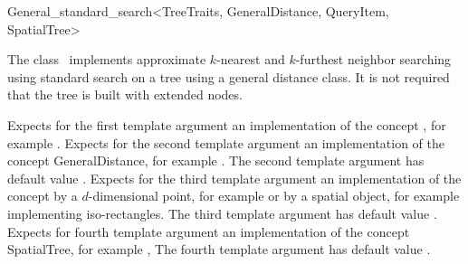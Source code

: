 

\begin{ccRefClass}{General_standard_search<TreeTraits, GeneralDistance, QueryItem, SpatialTree>}  %


\ccDefinition
  
The class \ccRefName\ implements approximate $k$-nearest and $k$-furthest neighbor searching
using standard search on a tree using a general distance 
class. It is not required that the tree is built with extended nodes.


\ccParameters

Expects for the first template argument an implementation of the concept ,
for example .
Expects for the second template argument an implementation of the
concept GeneralDistance, for example .
The second template argument has default value 
.
Expects for the third template argument an implementation of the concept
by a $d$-dimensional point, for example 
or by a spatial object, for
example  implementing iso-rectangles.
The third template argument has default value .
Expects for fourth template argument an implementation of the concept SpatialTree,
for example ,
The fourth template argument has default value .

\ccTypes



\end{ccRefClass}
